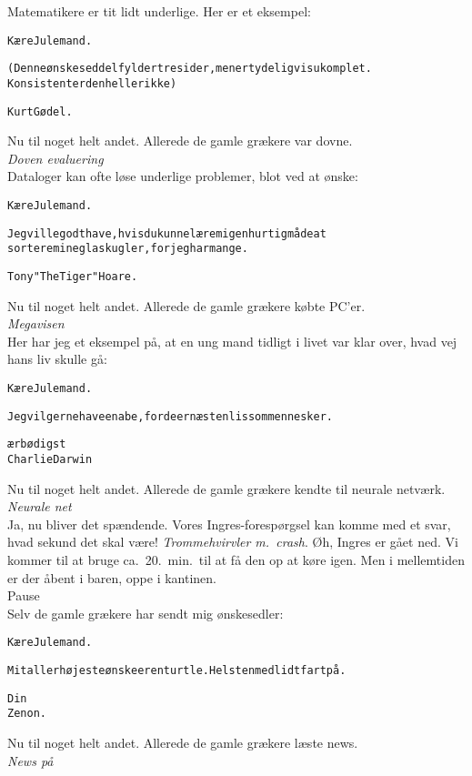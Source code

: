 \documentclass[a4paper,11pt]{article}
\begin{document}
\pagebreak

\noindent
Matematikere er tit lidt underlige. Her er et eksempel: \\
\begin{alltt}
{\rm
K\ae{}re Julemand.

(Denne \o{}nskeseddel fylder tre sider, men er tydeligvis ukomplet.
Konsistent er den heller ikke)

                                 Kurt G\o{}del.
}
\end{alltt}
Nu til noget helt andet. Allerede de gamle gr\ae{}kere var dovne. \\
{\em Doven evaluering} \\
Dataloger kan ofte l\o{}se underlige problemer, blot ved at \o{}nske:
\begin{alltt}
{\rm
K\ae{}re Julemand.

Jeg ville godt have, hvis du kunne l\ae{}re mig en hurtig m\aa{}de at
sortere mine glaskugler, for jeg har mange.

                            Tony "The Tiger" Hoare.
}
\end{alltt}
Nu til noget helt andet. Allerede de gamle gr\ae{}kere k\o{}bte PC'er. \\
{\em Megavisen} \\
Her har jeg et eksempel p\aa{}, at en ung mand tidligt i livet var klar
over, hvad vej hans liv skulle g\aa{}:
\begin{alltt}
{\rm
K\ae{}re Julemand.

Jeg vil gerne have en abe, for de er n\ae{}sten lissom mennesker.

                            \ae{}rb\o{}digst
                            Charlie Darwin
}
\end{alltt}
Nu til noget helt andet. Allerede de gamle gr\ae{}kere kendte til neurale netv\ae{}rk. \\
{\em Neurale net} \\
Ja, nu bliver det sp\ae{}ndende. Vores Ingres-foresp\o{}rgsel kan komme med
et svar, hvad sekund det skal v\ae{}re! {\em Trommehvirvler m.\ crash}.
\O{}h, Ingres er g\aa{}et ned. Vi kommer til at bruge ca.\ 20.\ min.\ til
at f\aa{} den op at k\o{}re igen. Men i mellemtiden er der \aa{}bent i baren,
oppe i kantinen. \\
{\LARGE Pause} \\
Selv de gamle gr\ae{}kere har sendt mig \o{}nskesedler: \\
\begin{alltt}
{\rm
K\ae{}re Julemand.

Mit allerh\o{}jeste \o{}nske er en turtle. Helst en med lidt fart p\aa{}.

                                 Din
                                 Zenon.
}
\end{alltt}
Nu til noget helt andet. Allerede de gamle gr\ae{}kere l\ae{}ste news. \\
{\em News p\aa{}} \\
\end{document}
